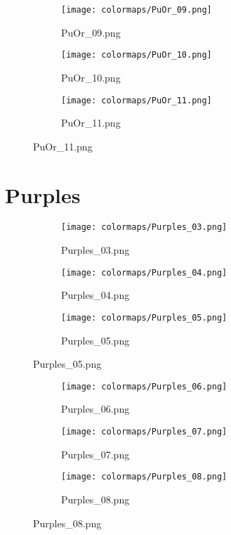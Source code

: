 \documentclass{article}%
\begin{document}
%
\hspace{1cm}\hfill%
\hspace{1cm}\hfill%
\hspace{1cm}\hfill%


\begin{figure}[h!]%
\begin{subfigure}[b]{0.3\linewidth}%
\texttt{[image: colormaps/PuOr\_09.png]}%
\caption{PuOr\_09.png}%
\end{subfigure}%
\begin{subfigure}[b]{0.3\linewidth}%
\texttt{[image: colormaps/PuOr\_10.png]}%
\caption{PuOr\_10.png}%
\end{subfigure}%
\begin{subfigure}[b]{0.3\linewidth}%
\texttt{[image: colormaps/PuOr\_11.png]}%
\caption{PuOr\_11.png}%
\end{subfigure}%
\end{figure}

%
\newpage%
\section{Purples}%
\label{sec:Purples}%
\hspace{1cm}\hfill%
\hspace{1cm}\hfill%
\hspace{1cm}\hfill%


\begin{figure}[h!]%
\begin{subfigure}[b]{0.3\linewidth}%
\texttt{[image: colormaps/Purples\_03.png]}%
\caption{Purples\_03.png}%
\end{subfigure}%
\begin{subfigure}[b]{0.3\linewidth}%
\texttt{[image: colormaps/Purples\_04.png]}%
\caption{Purples\_04.png}%
\end{subfigure}%
\begin{subfigure}[b]{0.3\linewidth}%
\texttt{[image: colormaps/Purples\_05.png]}%
\caption{Purples\_05.png}%
\end{subfigure}%
\end{figure}

%
\hspace{1cm}\hfill%
\hspace{1cm}\hfill%
\hspace{1cm}\hfill%


\begin{figure}[h!]%
\begin{subfigure}[b]{0.3\linewidth}%
\texttt{[image: colormaps/Purples\_06.png]}%
\caption{Purples\_06.png}%
\end{subfigure}%
\begin{subfigure}[b]{0.3\linewidth}%
\texttt{[image: colormaps/Purples\_07.png]}%
\caption{Purples\_07.png}%
\end{subfigure}%
\begin{subfigure}[b]{0.3\linewidth}%
\texttt{[image: colormaps/Purples\_08.png]}%
\caption{Purples\_08.png}%
\end{subfigure}%
\end{figure}
\end{document}
